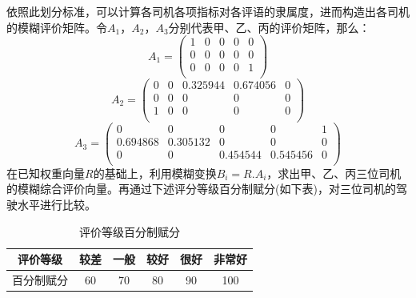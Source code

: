 \documentclass[bwprint]{cumcmthesis}
\begin{document}
            依照此划分标准，可以计算各司机各项指标对各评语的隶属度，进而构造出各司机的模糊评价矩阵。令$A_1$，$A_2$，$A_3$分别代表甲、乙、丙的评价矩阵，那么：
            \[
                A_1 = 
                \begin{pmatrix}
                    1 & 0 & 0 & 0 & 0  \\
                    0 & 0 & 0 & 0 & 0  \\
                    0 & 0 & 0 & 0 & 1  \\
                \end{pmatrix}
            \]
            \[    
                A_2 = 
                \begin{pmatrix}
                    0 & 0 & 0.325944 & 0.674056 & 0  \\
                    0 & 0 & 0 & 0 & 0  \\
                    1 & 0 & 0 & 0 & 0  \\
                \end{pmatrix}
            \]
            \[
                A_3 = 
                \begin{pmatrix}
                    0 & 0 & 0 & 0 & 1  \\
                    0.694868 & 0.305132 & 0 & 0 & 0  \\
                    0 & 0 & 0.454544 & 0.545456 & 0  \\
                \end{pmatrix}
            \]
            在已知权重向量$R$的基础上，利用模糊变换$B_i=R.A_i$，求出甲、乙、丙三位司机的模糊综合评价向量。再通过下述评分等级百分制赋分(如下表)，对三位司机的驾驶水平进行比较。
            \begin{table}[htbp]
                \centering
                \caption{评价等级百分制赋分}
                    \begin{tabular}{|c|c|c|c|c|c|}
                    \hline
                    评价等级  & 较差    & 一般    & 较好    & 很好    & 非常好 \\
                    \hline
                    百分制赋分 & 60    & 70    & 80    & 90    & 100 \\
                    \hline
                    \end{tabular}
                \label{tab:ten}
            \end{table}
            
\end{document}
